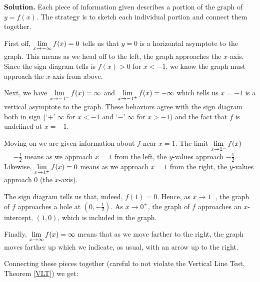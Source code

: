 \documentclass{ximera}
\begin{document}
\begin{example}
\begin{center}
\end{center}



{\bf Solution.} Each piece of information given describes a portion of the graph of $y = f(x)$.  The strategy is to sketch each individual portion and connect them together.

\medskip

First off, $\ds{\lim_{x \rightarrow -\infty} f(x) = 0}$ tells us that $y = 0$ is a horizontal asymptote to the graph.  This means as we head off to the left, the graph approaches the $x$-axis.  Since the sign diagram tells is $f(x) > 0$ for $x<-1$, we know the graph must approach the $x$-axis from above.

\medskip

Next, we have $\ds{\lim_{x \rightarrow -1^{-}} f(x) = \infty}$ and  $\ds{\lim_{x \rightarrow -1^{+}} f(x) = - \infty}$ which tells us $x=-1$ is a vertical asymptote to the graph.  These behaviors agree with the sign diagram both in sign (`$+$' $\infty$ for $x<-1$ and `$-$' $\infty$ for $x>-1$) and the fact that $f$ is undefined at $x = -1$.

\medskip

Moving on we are given information about $f$ near $x = 1$.    The limit $\ds{\lim_{x \rightarrow 1^{-}} f(x)}$ $= -\frac{1}{2}$  means as we approach $x=1$ from the left, the $y$-values approach $-\frac{1}{2}$.  Likewise, $\ds{\lim_{x \rightarrow 1^{+}} f(x) = 0}$ means as we approach $x=1$ from the right, the $y$-values approach $0$ (the $x$-axis).  

\medskip

The sign diagram tells us that, indeed, $f(1) = 0$.  Hence, as $x \rightarrow 1^{-}$,  the graph of $f$ approaches a hole at $\left(0, -\frac{1}{2}\right)$.  As $x \rightarrow 0^{+}$, the graph of $f$ approaches an $x$-intercept, $(1,0)$, which is included in the graph. 

\medskip

Finally,   $\ds{\lim_{x \rightarrow \infty } f(x) = \infty}$  means that as we move farther to the right, the graph moves farther up which we indicate, as usual, with an arrow up to the right.

\medskip

Connecting these pieces together (careful to not violate the Vertical Line Test, Theorem \ref{VLT}) we get:

\begin{center}



\end{center}
\end{example}
\end{document}
